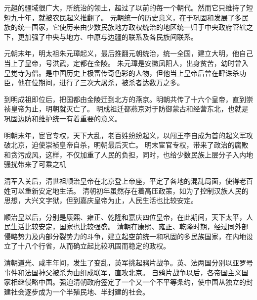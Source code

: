 \documentclass[avery5371,grid]{flashcards}
\begin{document}
{元趄的疆域很广大，所统治的领土，超过了以前的每一个朝代。然而它只维持了短短九十年，就被农民起义推翻了。} %
{元朝统一的历史意义，在于巩固和发展了多民族的统一国家，它使历来由少数民族地方政权统治的地区统一归于中央政府管辖之下，更加强了中央与地方、中原与边疆的联系及各民族间联系。} %

{元朝末年，明太祖朱元璋起义，最后推翻元朝统治，统一全国，建立大明，他自己当上了皇帝，号洪武，定都在金陵。} %
{朱元璋是安徽凤阳人，出身贫苦，幼时曾入皇觉寺为僧。是中国历史上极富传奇色彩的人物，但他当上皇帝后曾在肆诛杀功臣，他在位期间，进行了三次大屠杀，被杀者达数万之多。} %

{到明成祖即位后，把国都由金陵迁到北方的燕京。明朝共传了十六个皇帝，直到崇祯皇帝为止，明朝就灭亡了。} %
{明成祖迁都燕京对于防御蒙古和经营东北，也就是巩固边防和维护统一有着重要的意义。} %

{明朝末年，宦官专权，天下大乱，老百姓纷纷起义，以闯王李自成为首的起义军攻破北京，迫使崇祯皇帝自杀，明朝最后灭亡。} %
{明末宦官专权，带来了政治的腐败和贪污成风，这样，不仅加重了人民的负担，同时，也给少数民族上层分子入内地骚扰带来了可乘之机} %

{清军入关后，清世祖顺治皇帝在北京登上帝座，平定了各地的混乱局面，使得老百姓可以重新安定地生活。} %
{清朝初年虽然存在着高压政策，如为了控制汉族人民的思想，大兴文字狱，但到嘉庆皇帝为止，人民生活也比较安定。} %

{顺治皇以后，分别是康熙、雍正、乾隆和嘉庆四位皇帝，在此期间，天下太平，人民生活比较安定，国家也比较强盛。} %
{清朝在康熙、雍正、乾隆时期，经过同外部侵略势力及内部分裂势力的斗争，建立起空前统一和巩固的多民族国家，在内地设立了十八个行省，从而确立起比较巩固而稳定的政权。} %

{清朝道光、咸丰年间，发生了变乱，英军挑起鸦片战争。英、法两国分别以亚罗号事件和法国神父被杀为由组成联军，直攻北京。} %
{自鸦片战争以后，各帝国主义国家相继侵略中国。强迫清朝政府签定了一个又一个不平等条约，使中国从独立的封建社会逐步成为一个半殖民地、半封建的社会。} %
\end{document}
